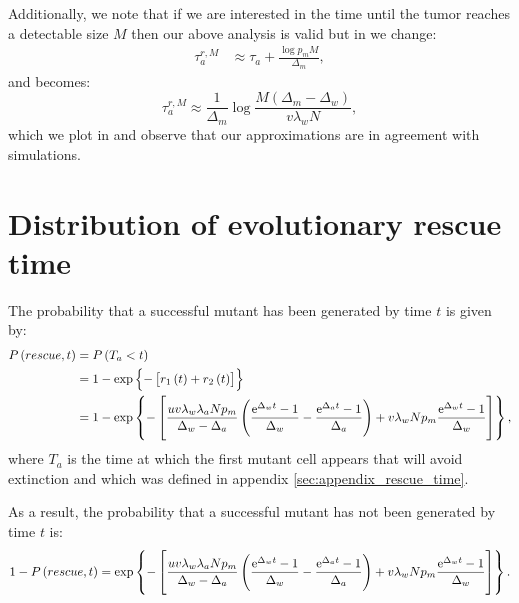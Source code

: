 \documentclass[12pt]{extarticle}
\newcommand{\e}{{\rm e}}
\begin{document}
\begin{appendices}
Additionally, we note that if we are interested in the time until the tumor reaches a detectable size $M$ then our above analysis is valid but in  we change:
\begin{align}\label{meanproliferationtime2}
\tau_a^{r,M}&\approx\tau_a+\frac{\log p_mM}{\Delta_m},
\end{align}
and  becomes:
\begin{equation}\label{eq:t2det2}
\tau_a^{r,M}\approx\frac{1}{\Delta_m}\log\frac{M\left(\Delta_m-\Delta_w\right)}{v\lambda_wN},
\end{equation}
which we plot in  and observe that our approximations are in agreement with simulations.

\section{Distribution of evolutionary rescue time}
The probability that a successful mutant has been generated by time $t$ is given by:
\begin{align*}
P\left(rescue,t\right)&=P\left(T_a<t\right)\\
&=1-\exp\left\{-\left[r_1\left(t\right)+r_2\left(t\right)\right]\right\}\\
&=1-\exp\left\{-\left[\frac{uv\lambda_w\lambda_aNp_m}{\Delta_w-\Delta_a}\left(\frac{\e^{\Delta_wt}-1}{\Delta_w}-\frac{\e^{\Delta_at}-1}{\Delta_a}\right)+ v\lambda_wNp_m\frac{\e^{\Delta_w t}-1}{\Delta_w}\right]\right\},
\end{align*}
where $T_a$ is the time at which the first mutant cell appears that will avoid extinction and which was defined in appendix \ref{sec:appendix_rescue_time}.

As a result, the probability that a successful mutant has not been generated by time $t$ is:
\begin{equation}
1-P\left(rescue,t\right)=\exp\left\{-\left[\frac{uv\lambda_w\lambda_aNp_m}{\Delta_w-\Delta_a}\left(\frac{\e^{\Delta_wt}-1}{\Delta_w}-\frac{\e^{\Delta_at}-1}{\Delta_a}\right)+ v\lambda_wNp_m\frac{\e^{\Delta_w t}-1}{\Delta_w}\right]\right\}.
\end{equation}

\end{appendices}
\end{document}
